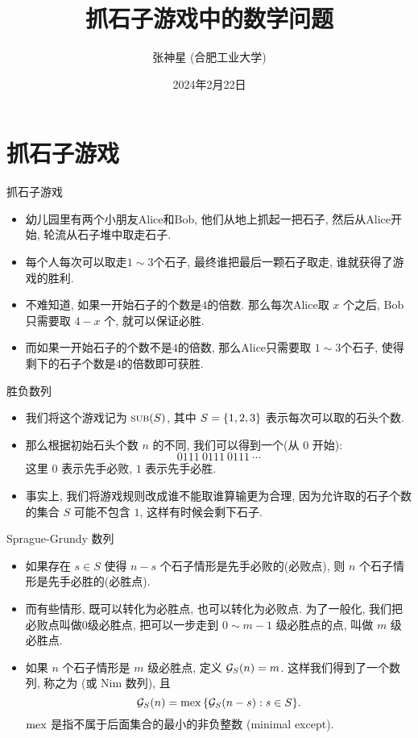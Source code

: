 \documentclass[aspectratio=169]{ctexbeamer}
\title{抓石子游戏中的数学问题}
\author{张神星 (合肥工业大学)}
\institute{哈尔滨工程大学}
\date{2024年2月22日}
\renewcommand\emph[1]{{\color{structure.fg!50!blue}{#1}}}
\DeclareMathOperator*{\SUB}{{\text{{\upshape\textsc{sub}}}}}
\begin{document}
\section{抓石子游戏}
\begin{frame}{抓石子游戏}
	\begin{itemize}
		\item 幼儿园里有两个小朋友Alice和Bob, 他们从地上抓起一把石子, 然后从Alice开始, 轮流从石子堆中取走石子.
		\item 每个人每次可以取走$1\sim3$个石子, 最终谁把最后一颗石子取走, 谁就获得了游戏的胜利.
		\item 不难知道, 如果一开始石子的个数是$4$的倍数. 那么每次Alice取 \alert{$x$} 个之后, Bob只需要取 \alert{$4-x$} 个, 就可以保证必胜.
		\item 而如果一开始石子的个数不是$4$的倍数, 那么Alice只需要取 $1\sim 3$个石子, 使得剩下的石子个数是$4$的倍数即可获胜.
	\end{itemize}
\end{frame}


\begin{frame}{胜负数列}
	\begin{itemize}
		\item 我们将这个游戏记为 $\SUB(S)$, 其中 $S={\left\{1,2,3\right\}}$ 表示每次可以取的石头个数.
		\item 那么根据初始石头个数 $n$ 的不同, 我们可以得到一个\emph{胜负数列}(从 $0$ 开始):
		\[0111\ 0111\ 0111\ \cdots\]
		这里 $0$ 表示先手必败, $1$ 表示先手必胜.
		\item 事实上, 我们将游戏规则改成\alert{谁不能取谁算输}更为合理, 因为允许取的石子个数的集合 $S$ 可能不包含 $1$, 这样有时候会剩下石子.
	\end{itemize}
\end{frame}


\begin{frame}{Sprague-Grundy 数列}
	\begin{itemize}
		\item 如果存在 $s\in S$ 使得 $n-s$ 个石子情形是先手必败的(必败点), 则 $n$ 个石子情形是先手必胜的(必胜点).
		\item 而有些情形, 既可以转化为必胜点, 也可以转化为必败点. 为了一般化, 我们把必败点叫做$0$级必胜点, 把可以一步走到 $0\sim m-1$ 级必胜点的点, 叫做 $m$ 级必胜点.
		\item 如果 $n$ 个石子情形是 $m$ 级必胜点, 定义 ${\mathcal{G}}_S(n)=m$.
		\onslide<+->
		这样我们得到了一个数列, 称之为 \emph{Sprague-Grundy 数列} (或 Nim 数列),
		\onslide<+->
		且
		\[{\mathcal{G}}_S(n)=\operatorname*{mex}{\left\{{\mathcal{G}}_S(n-s): s\in S\right\}}.\]
		$\operatorname*{mex}$ 是指不属于后面集合的最小的非负整数 (minimal except).
	\end{itemize}
\end{frame}
\end{document}
